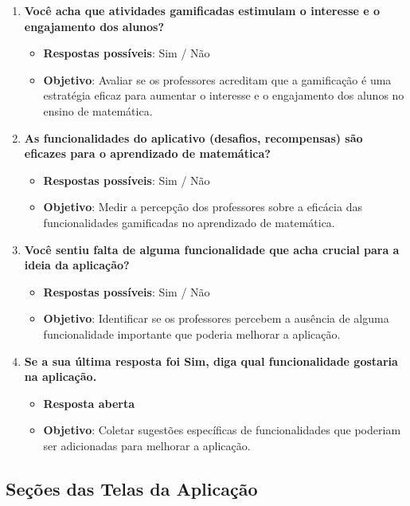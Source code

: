 \begin{enumerate}
    \item \textbf{Você acha que atividades gamificadas estimulam o interesse e o engajamento dos alunos?}
    \begin{itemize}
        \item \textbf{Respostas possíveis}: Sim / Não
        \item \textbf{Objetivo}: Avaliar se os professores acreditam que a gamificação é uma estratégia eficaz para aumentar o interesse e o engajamento dos alunos no ensino de matemática.
    \end{itemize}

    \item \textbf{As funcionalidades do aplicativo (desafios, recompensas) são eficazes para o aprendizado de matemática?}
    \begin{itemize}
        \item \textbf{Respostas possíveis}: Sim / Não
        \item \textbf{Objetivo}: Medir a percepção dos professores sobre a eficácia das funcionalidades gamificadas no aprendizado de matemática.
    \end{itemize}

    \item \textbf{Você sentiu falta de alguma funcionalidade que acha crucial para a ideia da aplicação?}
    \begin{itemize}
        \item \textbf{Respostas possíveis}: Sim / Não
        \item \textbf{Objetivo}: Identificar se os professores percebem a ausência de alguma funcionalidade importante que poderia melhorar a aplicação.
    \end{itemize}

    \item \textbf{Se a sua última resposta foi Sim, diga qual funcionalidade gostaria na aplicação.}
    \begin{itemize}
        \item \textbf{Resposta aberta}
        \item \textbf{Objetivo}: Coletar sugestões específicas de funcionalidades que poderiam ser adicionadas para melhorar a aplicação.
    \end{itemize}
\end{enumerate}

\subsection{Seções das Telas da Aplicação}

